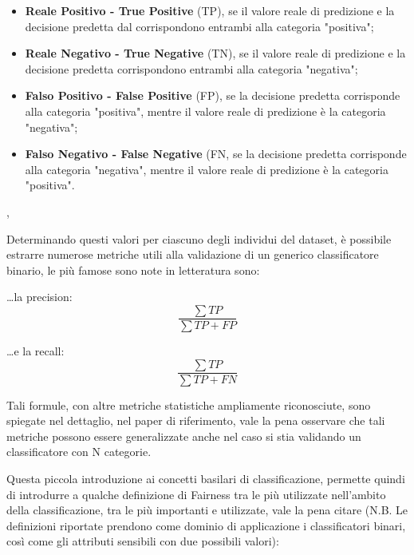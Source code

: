  \begin{itemize}
     \item \textbf{Reale Positivo - True Positive} (TP), se il valore reale di predizione e la decisione predetta dal corrispondono entrambi alla categoria "positiva";
     \item \textbf{Reale Negativo - True Negative} (TN), se il valore reale di predizione e la decisione predetta corrispondono entrambi alla categoria "negativa";
     \item \textbf{Falso Positivo - False Positive} (FP), se la decisione predetta corrisponde alla categoria "positiva", mentre il valore reale di predizione è la categoria "negativa";
    \item \textbf{Falso Negativo - False Negative} (FN, se la decisione predetta corrisponde alla categoria "negativa", mentre il valore reale di predizione è la categoria "positiva".
 \end{itemize}, 
 
 Determinando questi valori per ciascuno degli individui del dataset, è possibile estrarre numerose metriche utili alla validazione di un generico classificatore binario, le più famose sono note in letteratura sono:
 
 \ldots la precision:
\begin{equation*}
\frac{\sum{TP}}{\sum{TP + FP}}
\end{equation*}


 \ldots  e la recall:
\begin{equation*}
\frac{\sum{TP}}{\sum{TP + FN}}
\end{equation*}

Tali formule, con altre metriche statistiche ampliamente riconosciute, sono spiegate nel dettaglio, nel paper  di riferimento\cite{FairnessDefinitionExplained}, vale la pena osservare che tali metriche possono essere generalizzate anche nel caso si stia validando un classificatore con N categorie.

Questa piccola introduzione ai concetti basilari di classificazione, permette quindi di introdurre a qualche definizione di Fairness tra le più utilizzate nell'ambito della classificazione, tra le più importanti e utilizzate, vale la pena citare (N.B. Le definizioni riportate prendono come dominio di applicazione i classificatori binari, così come gli attributi sensibili con due possibili valori)\cite{FairnessDefinitionExplained}:

